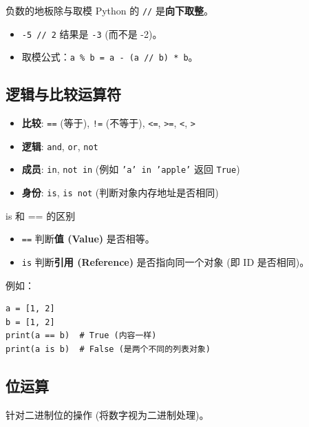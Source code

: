 \documentclass[12pt, a4paper]{article}
\begin{document}
\begin{trapbox}{负数的地板除与取模}
Python 的 \texttt{//} 是\textbf{向下取整}。
\begin{itemize}
    \item \texttt{-5 // 2} 结果是 \texttt{-3} (而不是 -2)。
    \item 取模公式：\texttt{a \% b = a - (a // b) * b}。
\end{itemize}
\end{trapbox}

\subsection{逻辑与比较运算符}

\begin{itemize}
    \item \textbf{比较}: \texttt{==} (等于), \texttt{!=} (不等于), \texttt{<=}, \texttt{>=}, \texttt{<}, \texttt{>}
    \item \textbf{逻辑}: \texttt{and}, \texttt{or}, \texttt{not}
    \item \textbf{成员}: \texttt{in}, \texttt{not in} (例如 \texttt{'a' in 'apple'} 返回 \texttt{True})
    \item \textbf{身份}: \texttt{is}, \texttt{is not} (判断对象内存地址是否相同)
\end{itemize}

\begin{importantbox}{is 和 == 的区别}
\begin{itemize}
    \item \texttt{==} 判断\textbf{值 (Value)} 是否相等。
    \item \texttt{is} 判断\textbf{引用 (Reference)} 是否指向同一个对象 (即 ID 是否相同)。
\end{itemize}
例如：
\begin{lstlisting}[basicstyle=\ttfamily\footnotesize]
a = [1, 2]
b = [1, 2]
print(a == b)  # True (内容一样)
print(a is b)  # False (是两个不同的列表对象)
\end{lstlisting}
\end{importantbox}

\subsection{位运算}
针对二进制位的操作 (将数字视为二进制处理)。
\end{document}

